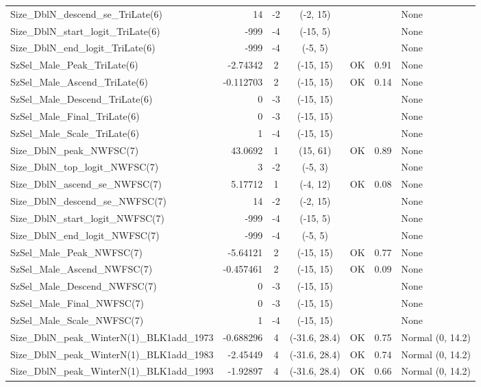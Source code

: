 \documentclass[12pt,]{article}
\begin{document}
\begin{landscape}
\begin{longtable}{lrcccll}
  Size\_DblN\_descend\_se\_TriLate(6) & 14 & -2 & (-2, 15) &  &  & None \\ 
  Size\_DblN\_start\_logit\_TriLate(6) & -999 & -4 & (-15, 5) &  &  & None \\ 
  Size\_DblN\_end\_logit\_TriLate(6) & -999 & -4 & (-5, 5) &  &  & None \\ 
  SzSel\_Male\_Peak\_TriLate(6) & -2.74342 & 2 & (-15, 15) & OK & 0.91 & None \\ 
  SzSel\_Male\_Ascend\_TriLate(6) & -0.112703 & 2 & (-15, 15) & OK & 0.14 & None \\ 
  SzSel\_Male\_Descend\_TriLate(6) & 0 & -3 & (-15, 15) &  &  & None \\ 
  SzSel\_Male\_Final\_TriLate(6) & 0 & -3 & (-15, 15) &  &  & None \\ 
  SzSel\_Male\_Scale\_TriLate(6) & 1 & -4 & (-15, 15) &  &  & None \\ 
  Size\_DblN\_peak\_NWFSC(7) & 43.0692 & 1 & (15, 61) & OK & 0.89 & None \\ 
  Size\_DblN\_top\_logit\_NWFSC(7) & 3 & -2 & (-5, 3) &  &  & None \\ 
  Size\_DblN\_ascend\_se\_NWFSC(7) & 5.17712 & 1 & (-4, 12) & OK & 0.08 & None \\ 
  Size\_DblN\_descend\_se\_NWFSC(7) & 14 & -2 & (-2, 15) &  &  & None \\ 
  Size\_DblN\_start\_logit\_NWFSC(7) & -999 & -4 & (-15, 5) &  &  & None \\ 
  Size\_DblN\_end\_logit\_NWFSC(7) & -999 & -4 & (-5, 5) &  &  & None \\ 
  SzSel\_Male\_Peak\_NWFSC(7) & -5.64121 & 2 & (-15, 15) & OK & 0.77 & None \\ 
  SzSel\_Male\_Ascend\_NWFSC(7) & -0.457461 & 2 & (-15, 15) & OK & 0.09 & None \\ 
  SzSel\_Male\_Descend\_NWFSC(7) & 0 & -3 & (-15, 15) &  &  & None \\ 
  SzSel\_Male\_Final\_NWFSC(7) & 0 & -3 & (-15, 15) &  &  & None \\ 
  SzSel\_Male\_Scale\_NWFSC(7) & 1 & -4 & (-15, 15) &  &  & None \\ 
  Size\_DblN\_peak\_WinterN(1)\_BLK1add\_1973 & -0.688296 & 4 & (-31.6, 28.4) & OK & 0.75 & Normal (0, 14.2) \\ 
  Size\_DblN\_peak\_WinterN(1)\_BLK1add\_1983 & -2.45449 & 4 & (-31.6, 28.4) & OK & 0.74 & Normal (0, 14.2) \\ 
  Size\_DblN\_peak\_WinterN(1)\_BLK1add\_1993 & -1.92897 & 4 & (-31.6, 28.4) & OK & 0.66 & Normal (0, 14.2) \\ 

\end{longtable}
\end{landscape}
\end{document}
